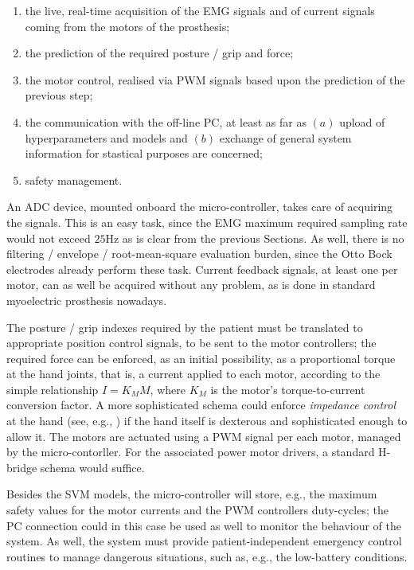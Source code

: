 \begin{enumerate}

  \item the live, real-time acquisition of the EMG signals and of
    current signals coming from the motors of the prosthesis;

  \item the prediction of the required posture / grip and force;

  \item the motor control, realised via PWM signals based upon the
    prediction of the previous step;

  \item the communication with the off-line PC, at least as far as
    $(a)$ upload of hyperparameters and models and $(b)$ exchange of
    general system information for stastical purposes are concerned;

  \item safety management.

\end{enumerate}

An ADC device, mounted onboard the micro-controller, takes care of
acquiring the signals. This is an easy task, since the EMG maximum
required sampling rate would not exceed $25$Hz as is clear from the
previous Sections. As well, there is no filtering / envelope /
root-mean-square evaluation burden, since the Otto Bock electrodes
already perform these task. Current feedback signals, at least one per
motor, can as well be acquired without any problem, as is done in
standard myoelectric prosthesis nowadays.

The posture / grip indexes required by the patient must be translated
to appropriate position control signals, to be sent to the motor
controllers; the required force can be enforced, as an initial
possibility, as a proportional torque at the hand joints, that is, a
current applied to each motor, according to the simple relationship $I
= K_M M$, where $K_M$ is the motor's torque-to-current conversion
factor. A more sophisticated schema could enforce \emph{impedance
control} at the hand (see, e.g., \cite{...}) if the hand itself is
dexterous and sophisticated enough to allow it. The motors are
actuated using a PWM signal per each motor, managed by the
micro-contorller. For the associated power motor drivers, a standard
H-bridge schema would suffice.

Besides the SVM models, the micro-controller will store, e.g., the
maximum safety values for the motor currents and the PWM controllers
duty-cycles; the PC connection could in this case be used as well to
monitor the behaviour of the system. As well, the system must provide
patient-independent emergency control routines to manage dangerous
situations, such as, e.g., the low-battery conditions.
